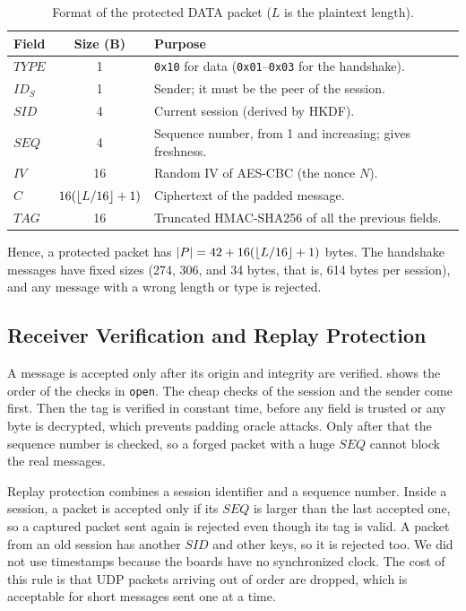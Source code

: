 \documentclass[11pt,a4paper]{article}
\begin{document}
\begin{table}[H]
    \centering
    \caption{Format of the protected DATA packet ($L$ is the plaintext length).}
    \label{tab:format}
    \small
    \begin{tabularx}{\textwidth}{@{}lcX@{}}
        \toprule
        \textbf{Field} & \textbf{Size (B)} & \textbf{Purpose} \\
        \midrule
        $\mathit{TYPE}$ & 1 & \texttt{0x10} for data (\texttt{0x01}--\texttt{0x03} for the handshake). \\
        $\mathit{ID}_S$ & 1 & Sender; it must be the peer of the session. \\
        $\mathit{SID}$  & 4 & Current session (derived by HKDF). \\
        $\mathit{SEQ}$  & 4 & Sequence number, from 1 and increasing; gives freshness. \\
        $\mathit{IV}$   & 16 & Random IV of AES-CBC (the nonce $N$). \\
        $C$             & $16(\left\lfloor L/16 \right\rfloor+1)$ & Ciphertext of the padded message. \\
        $\mathit{TAG}$  & 16 & Truncated HMAC-SHA256 of all the previous fields. \\
        \bottomrule
    \end{tabularx}
\end{table}

Hence, a protected packet has $\left\lvert P \right\rvert = 42 + 16(\left\lfloor L/16 \right\rfloor + 1)$ bytes. The
handshake messages have fixed sizes (274, 306, and 34 bytes, that is, 614 bytes
per session), and any message with a wrong length or type is rejected.

\subsection{Receiver Verification and Replay Protection}

A message is accepted only after its origin and integrity are verified.
 shows the order of the checks in
\texttt{open}. The cheap checks of the session and the sender come first. Then
the tag is verified in constant time, before any field is trusted or any byte
is decrypted, which prevents padding oracle attacks. Only after that the
sequence number is checked, so a forged packet with a huge $\mathit{SEQ}$
cannot block the real messages.

Replay protection combines a session identifier and a sequence number. Inside a
session, a packet is accepted only if its
$\mathit{SEQ}$ is larger than the last accepted one, so a captured packet sent
again is rejected even though its tag is valid. A packet from an old session
has another $\mathit{SID}$ and other keys, so it is rejected too. We did not use
timestamps because the boards have no synchronized clock. The cost of this rule
is that UDP packets arriving out of order are dropped, which is acceptable for
short messages sent one at a time.
\end{document}
